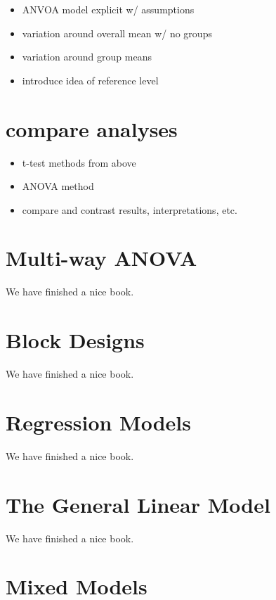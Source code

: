 \documentclass[
]{book}
\providecommand{\tightlist}{%
  \setlength{\itemsep}{0pt}\setlength{\parskip}{0pt}}
\theoremstyle{definition}
\theoremstyle{definition}
\theoremstyle{definition}
\theoremstyle{remark}
\begin{document}
\begin{itemize}
\tightlist
\item
  ANVOA model explicit w/ assumptions
\item
  variation around overall mean w/ no groups
\item
  variation around group means
\item
  introduce idea of reference level
\end{itemize}

\hypertarget{compare-analyses}{%
\chapter{compare analyses}\label{compare-analyses}}

\begin{itemize}
\tightlist
\item
  t-test methods from above
\item
  ANOVA method
\item
  compare and contrast results, interpretations, etc.
\end{itemize}

\hypertarget{multiway}{%
\chapter{Multi-way ANOVA}\label{multiway}}

We have finished a nice book.

\hypertarget{block}{%
\chapter{Block Designs}\label{block}}

We have finished a nice book.

\hypertarget{regression}{%
\chapter{Regression Models}\label{regression}}

We have finished a nice book.

\hypertarget{glm}{%
\chapter{The General Linear Model}\label{glm}}

We have finished a nice book.

\hypertarget{mixedmodels}{%
\chapter{Mixed Models}\label{mixedmodels}}
\end{document}
